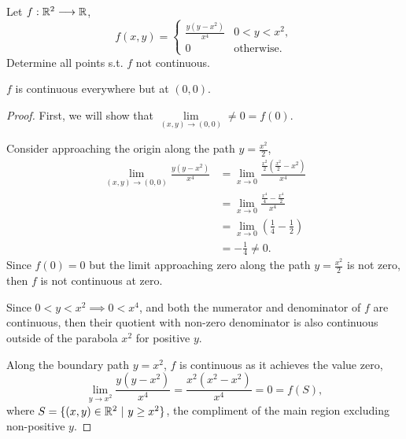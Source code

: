 \documentclass[../hw2]{subfiles}
\begin{document}
\begin{problem}[3]
Let $f:\mathbb{R}^2\longrightarrow\mathbb{R}$,\[
	f(x,y)=\begin{cases}
		\frac{y(y-x^2)}{x^4} & 0<y<x^2,          \\
		0                    & \text{otherwise}.
	\end{cases}
\]
Determine all points s.t. $f$ not continuous.
\end{problem}

\begin{proposition}
	$f$ is continuous everywhere but at $(0,0)$.
\end{proposition}
\begin{proof}
	First, we will show that $\lim\limits_{(x,y)\to(0,0)}\neq 0 = f(0)$.

	Consider approaching the origin along the path $y=\frac{x^2}{2}$,
	\begin{align*}
		\lim\limits_{(x,y)\to(0,0)}\frac{y(y-x^2)}{x^4} & = \lim\limits_{x\to 0} \frac{\frac{x^2}{2}\left(\frac{x^2}{2}-x^2\right)}{x^4} \\
		                                                & = \lim\limits_{x\to 0} \frac{\frac{x^4}{4}-\frac{x^4}{2}}{x^4}                 \\
		                                                & = \lim\limits_{x\to 0}\left( \frac{1}{4}-\frac{1}{2} \right)                   \\
		                                                & = -\frac{1}{4}\neq 0
		.\end{align*}
	Since $f(0)=0$ but the limit approaching zero along the path $y=\frac{x^2}{2}$ is not zero, then  $f$ is not continuous at zero.

	Since $0<y<x^2\implies 0<x^4$, and both the numerator and denominator of $f$ are continuous, then their quotient with non-zero denominator is also continuous outside of the parabola $x^2$ for positive $y$.

	Along the boundary path $y=x^2$, $f$ is continuous as it achieves the value zero, \[
		\lim\limits_{y\to x^2}\frac{y(y-x^2)}{x^4}=\frac{x^2(x^2-x^2)}{x^4}=0=f(S)
		,\] where $S=\{(x,y)\in \mathbb{R}^{2}\ |\ y\ge x^2\}$, the compliment of the main region excluding non-positive $y$.
\end{proof}
\end{document}
